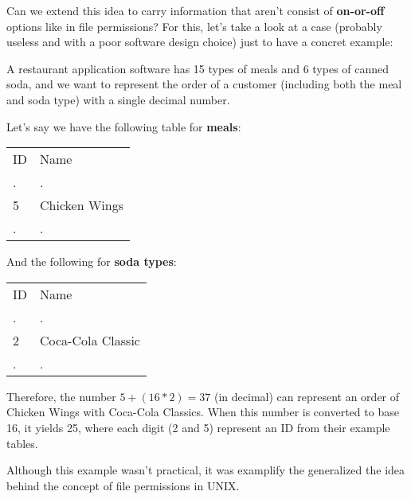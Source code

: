\documentclass[11pt]{article}
\begin{document}
Can we extend this idea to carry information that aren't consist of \textbf{on-or-off} options like in file permissions?
For this, let's take a look at a case (probably useless and with a poor software design choice) just to have a concret example:

A restaurant application software has 15 types of meals and 6 types of canned soda, and we want to represent the order of a customer (including both the meal and soda type) with a single decimal number.

Let's say we have the following table for \textbf{meals}:

\begin{center}
\begin{tabular}{ll}
ID & Name\\
. & .\\
5 & Chicken Wings\\
. & .\\
\end{tabular}
\end{center}

And the following for \textbf{soda types}:

\begin{center}
\begin{tabular}{ll}
ID & Name\\
. & .\\
2 & Coca-Cola Classic\\
. & .\\
\end{tabular}
\end{center}

Therefore, the number \(5 + (16*2) = 37\) (in decimal) can represent an order of Chicken Wings with Coca-Cola Classics.
When this number is converted to base 16, it yields 25, where each digit (2 and 5) represent an ID from their example tables.

Although this example wasn't practical, it was examplify the generalized the idea behind the concept of file permissions in UNIX. 
\end{document}
